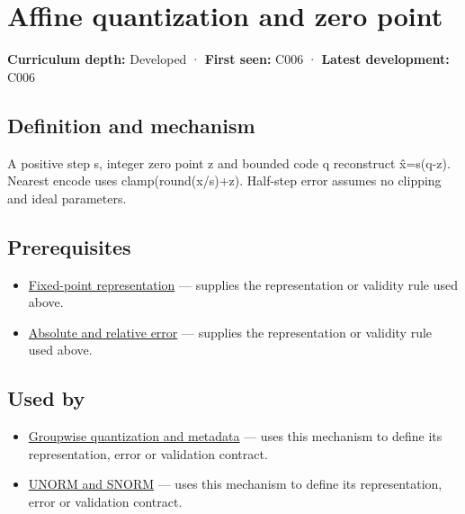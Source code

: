\hypertarget{appendix-d5da3eaabaef}{}\label{referencestart:appendix-d5da3eaabaef}
\section{Affine quantization and zero point}\label{appendix-d5da3eaabaef-affine-quantization-and-zero-point}

\textbf{Curriculum depth:} Developed · \textbf{First seen:} C006 · \textbf{Latest development:} C006

\subsection{Definition and mechanism}\label{appendix-d5da3eaabaef-definition-and-mechanism}

A positive step s, integer zero point z and bounded code q reconstruct x̂=s(q-z). Nearest encode uses clamp(round(x/s)+z). Half-step error assumes no clipping and ideal parameters.

\subsection{Prerequisites}\label{appendix-d5da3eaabaef-prerequisites}

\begin{itemize}
\tightlist
\item
  \hyperref[appendix-1d0dbe8924cc]{Fixed-point representation} --- supplies the representation or validity rule used above.
\item
  \hyperref[appendix-3ae74e89b4e6]{Absolute and relative error} --- supplies the representation or validity rule used above.
\end{itemize}

\subsection{Used by}\label{appendix-d5da3eaabaef-used-by}

\begin{itemize}
\tightlist
\item
  \hyperref[appendix-638204c40e8b]{Groupwise quantization and metadata} --- uses this mechanism to define its representation, error or validation contract.
\item
  \hyperref[appendix-b2402c453dac]{UNORM and SNORM} --- uses this mechanism to define its representation, error or validation contract.
\end{itemize}


